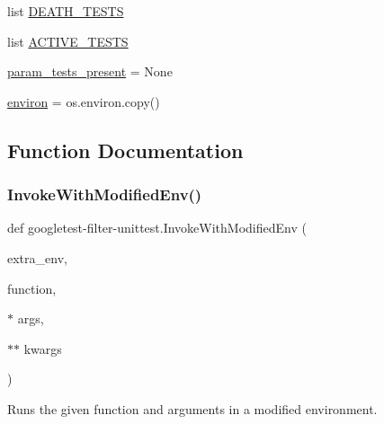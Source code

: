 \begin{DoxyCompactItemize}
\item 
list \mbox{\hyperlink{namespacegoogletest-filter-unittest_aabdb029d6197857aa36347476f031449}{D\+E\+A\+T\+H\+\_\+\+T\+E\+S\+TS}}
\item 
list \mbox{\hyperlink{namespacegoogletest-filter-unittest_a9c76128524d4e2787c76acf5c87ebb70}{A\+C\+T\+I\+V\+E\+\_\+\+T\+E\+S\+TS}}
\item 
\mbox{\hyperlink{namespacegoogletest-filter-unittest_a2ce0274f4bc360e4067e20ed2bfc439b}{param\+\_\+tests\+\_\+present}} = None
\item 
\mbox{\hyperlink{namespacegoogletest-filter-unittest_ad7660cddc4ddfdcae447d8edceddfd4e}{environ}} = os.\+environ.\+copy()
\end{DoxyCompactItemize}


\subsection{Function Documentation}
\mbox{\label{namespacegoogletest-filter-unittest_aaad57c395db92d5b0cdd94a3af2359bf}} 
\subsubsection{\texorpdfstring{InvokeWithModifiedEnv()}{InvokeWithModifiedEnv()}}
{\footnotesize\ttfamily def googletest-\/filter-\/unittest.\+Invoke\+With\+Modified\+Env (\begin{DoxyParamCaption}\item[{}]{extra\+\_\+env,  }\item[{}]{function,  }\item[{$\ast$}]{args,  }\item[{$\ast$$\ast$}]{kwargs }\end{DoxyParamCaption})}

\begin{DoxyVerb}Runs the given function and arguments in a modified environment.\end{DoxyVerb}
 \mbox{\label{namespacegoogletest-filter-unittest_a400558042f3187a396a3dfe020423dfb}} 
